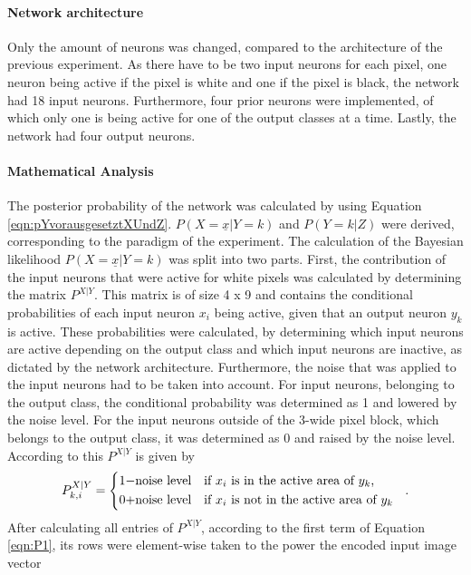  
\paragraph{Network architecture}
Only the amount of neurons was changed, compared to the architecture of the previous experiment. As there have to be two input neurons for each pixel, one neuron being active if the pixel is white and one if the pixel is black, the network had 18 input neurons. Furthermore, four prior neurons were implemented, of which only one is being active for one of the output classes at a time. Lastly, the network had four output neurons.

\paragraph{Mathematical Analysis}
The posterior probability of the network was calculated by using Equation \ref{eqn:pYvorausgesetztXUndZ}.
$P(X=\underline{x}|Y=k)$ and $P(Y=k|Z)$ were derived, corresponding to the paradigm of the experiment.
 The calculation of the Bayesian likelihood $P(X=\underline{x}|Y=k)$ was split into two parts. First, the contribution of the input neurons that were active for white pixels was calculated by determining the matrix $P^{X|Y}$. This matrix is of size 4 x 9 and contains the conditional probabilities of each input neuron $x_i$ being active, given that an output neuron $y_k$ is active. These probabilities were calculated, by determining which input neurons are active depending on the output class and which input neurons are inactive, as dictated by the network architecture. Furthermore, the noise that was applied to the input neurons had to be taken into account. For input neurons, belonging to the output class, the conditional probability was determined as 1 and lowered by the noise level. For the input neurons outside of the 3-wide pixel block, which belongs to the output class, it was determined as 0 and raised by the noise level. According to this $P^{X|Y}$ is given by
\begin{equation}
\label{eqn:PXvorausgesetztYIf}
P_{k,i}^{X|Y} = \begin{dcases*} 1 - $noise level$ & if $x_i$ is in the active area of $y_k$, \\
0 + $noise level$ & \text{if $x_i$ is not in the active area of $ y_k $ } \end{dcases*}.\end{equation}
After calculating all entries of $P^{X|Y}$, according to the first term of Equation \ref{eqn:P1}, its rows were element-wise taken to the power the encoded input image vector

